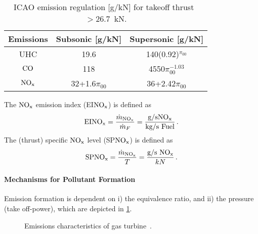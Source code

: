 \begin{table}[!h!]
  \begin{center}
    \begin{tabular}{|c|c|c|}\hline
    Emissions & Subsonic [g/kN] & Supersonic [g/kN]\\\hline\hline
    UHC & 19.6 & 140(0.92)$^{\pi_{00}}$ \\
    $\mathrm{CO}$ & 118 & 4550$\pi_{00}^{-1.03}$\\
    $\mathrm{NO_x}$ & 32+1.6$\pi_{00}$ & 36+2.42$\pi_{00}$\\\hline
    \end{tabular}
    \caption{\label{TAB_ICAO_EMISSIONS}ICAO emission regulation [g/kN] for takeoff thrust~$> 26.7$~kN.}
  \end{center}
\end{table}

The $\mathrm{NO_x}$ emission index (EI$\mathrm{NO_x}$) is defined as
\begin{equation}
  \text{EI}\mathrm{NO_x} = {\frac{\dot{m}_{\mathrm{NO_x}}}{\dot{m}_F}} = {\frac{\text{g/s}\mathrm{NO_x}}{\text{kg/s Fuel}}}\,.
\end{equation}
The (thrust) specific $\mathrm{NO_x}$ level (SP$\mathrm{NO_x}$) is defined as
\begin{equation}
  \text{SP}\mathrm{NO_x} = {\frac{\dot{m}_{\mathrm{NO_x}}}{T}} = {\frac{\text{g/s \ensuremath{\mathrm{NO_x}}}}{kN}}\,.
\end{equation}

\paragraph{Mechanisms for Pollutant Formation}
Emission formation is dependent on i) the equivalence ratio, and ii) the pressure (take off-power), which are depicted in \cref{FIG_EMISSION_EQ_POWER}.

\begin{figure}[!htb!]
 \centering
    \caption{\label{FIG_EMISSION_EQ_POWER}Emissions characteristics of gas turbine~\cite{LEFEBVRE_BOOK1999}.}
\end{figure}


